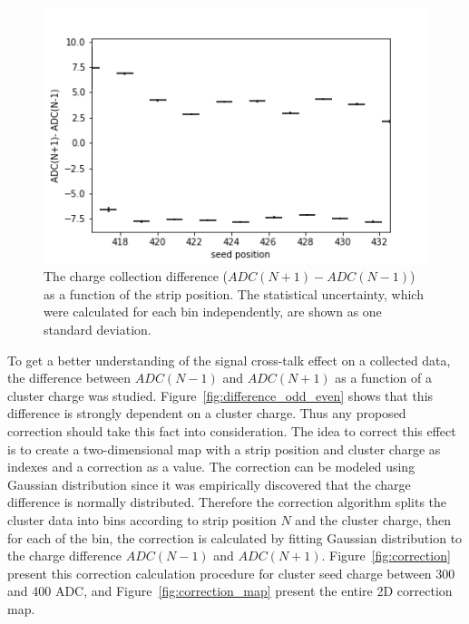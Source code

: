 \begin{figure}[htb]
\centering
\includegraphics[scale=0.5]{figures/eta/profile_0deg.png}
\caption{The charge collection difference ($ADC(N+1) - ADC(N-1)$) as a function of the strip position. The statistical uncertainty, which were calculated for each bin independently, are shown as one standard deviation. }
\label{fig:charge asymmetry profile}
\end{figure}

To get a better understanding of the signal cross-talk effect on a collected data, the difference between $ADC(N-1)$ and $ADC(N+1)$ as a function of a cluster charge was studied. Figure~\ref{fig:difference_odd_even} shows that this difference is strongly dependent on a cluster charge. Thus any proposed correction should take this fact into consideration.  The idea to correct this effect is to create a two-dimensional map with a strip position and cluster charge as indexes and a correction as a value. The correction can be modeled using Gaussian distribution since it was empirically discovered that the charge difference is normally distributed.
Therefore the correction algorithm splits the cluster data into bins according to strip position $N$ and the cluster charge, then for each of the bin, the correction is calculated by fitting Gaussian distribution to the charge difference  $ADC(N-1)$ and $ADC(N+1)$. 
Figure~\ref{fig:correction} present this correction calculation procedure for cluster seed charge between 300 and 400 ADC, and Figure~\ref{fig:correction_map} present the entire 2D correction map. 

